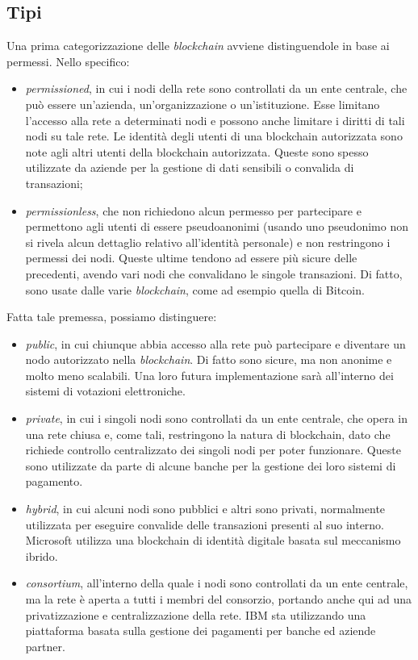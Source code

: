 \subsection{Tipi}\label{sec:tecnologie-blockchain-tipi}
Una prima categorizzazione delle \textit{blockchain} avviene distinguendole in base ai permessi. Nello specifico:
\begin{itemize}
    \item \textit{permissioned}, in cui i nodi della rete sono controllati da un ente centrale, che può essere un'azienda, un'organizzazione o un'istituzione.
    Esse limitano l'accesso alla rete a determinati nodi e possono anche limitare i diritti di tali nodi su tale rete. Le identità degli utenti di una blockchain autorizzata sono note agli altri utenti della blockchain autorizzata.
    Queste sono spesso utilizzate da aziende per la gestione di dati sensibili o convalida di transazioni;
    \item \textit{permissionless}, che non richiedono alcun permesso per partecipare e permettono agli utenti di essere pseudoanonimi 
    (usando uno pseudonimo non si rivela alcun dettaglio relativo all'identità personale) e non restringono i permessi dei nodi. Queste ultime tendono ad essere più sicure delle precedenti, avendo vari nodi che convalidano le singole transazioni.
    Di fatto, sono usate dalle varie \textit{blockchain}, come ad esempio quella di Bitcoin.
\end{itemize}

Fatta tale premessa, possiamo distinguere:
\begin{itemize}
    \item \textit{public}, in cui chiunque abbia accesso alla rete può partecipare e diventare un nodo autorizzato nella \textit{blockchain}. Di fatto sono sicure, ma non anonime e molto meno scalabili.
    Una loro futura implementazione sarà all'interno dei sistemi di votazioni elettroniche.
    \item \textit{private}, in cui i singoli nodi sono controllati da un ente centrale, che opera in una rete chiusa e, come tali, restringono la natura di blockchain, dato che richiede controllo centralizzato dei singoli nodi per poter funzionare.
    Queste sono utilizzate da parte di alcune banche per la gestione dei loro sistemi di pagamento.
    \item \textit{hybrid}, in cui alcuni nodi sono pubblici e altri sono privati, normalmente utilizzata per eseguire convalide delle transazioni presenti al suo interno.
    Microsoft utilizza una blockchain di identità digitale basata sul meccanismo ibrido.
    \item \textit{consortium}, all'interno della quale i nodi sono controllati da un ente centrale, ma la rete è aperta a tutti i membri del consorzio, portando anche qui ad una privatizzazione e centralizzazione della rete.
    IBM sta utilizzando una piattaforma basata sulla gestione dei pagamenti per banche ed aziende partner.
\end{itemize}

